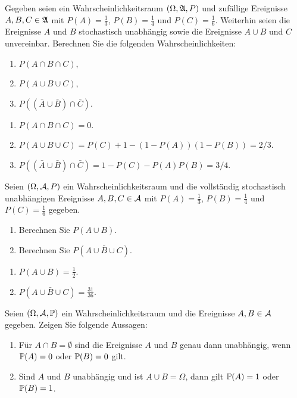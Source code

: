 Gegeben seien  ein Wahrscheinlichkeitsraum $(\Omega, \mathfrak{A}, P)$ und zuf\"allige Ereignisse $A, B, C
\in \mathfrak{A}$  mit $P(A)=\frac{1}{3}$, $P(B)=\frac{1}{4}$ und $P(C)=\frac{1}{6}$. 
Weiterhin seien die Ereignisse $A$ und $B$ stochastisch unabhängig sowie die Ereignisse $A\cup B$
und $C$ unvereinbar. Berechnen Sie die folgenden Wahrscheinlichkeiten:
\begin{enumerate}
    \item $P(A \cap B \cap C)$,
    \item $P(A \cup B \cup C)$,
    \item $P( ( \bar A \cup \bar B) \cap \bar C )$.
\end{enumerate}

\solution
\begin{enumerate}
    \item $P(A \cap B \cap C) = 0$.
    \item $P(A \cup B \cup C) = P(C) + 1 - (1 - P(A))(1-P(B)) = 2/3$.
    \item $P( ( \bar A \cup \bar B) \cap \bar C ) = 1 - P(C) - P(A)P(B) = 3/4$.
\end{enumerate}

Seien $(\Omega, \mathcal A, P)$ ein Wahrscheinlichkeitsraum und die vollständig
stochastisch unabhängigen Ereignisse $A, B, C \in \mathcal A$ mit $P(A)=\frac{1}{3}$,
$P(B)=\frac{1}{4}$ und $P(C)=\frac{1}{6}$ gegeben.
\begin{enumerate}
    \item Berechnen Sie $P(A \cup B)$.
    \item Berechnen Sie $P( A \cup \bar B \cup C)$.
\end{enumerate}

\solution
\begin{enumerate}
    \item $P(A \cup B) = \frac{1}{2}$. %
    \item $P(A \cup \bar B \cup C) = \frac{31}{36}$.  %
\end{enumerate}

 Seien $(\Omega, \mathcal A, \mathbb P)$ ein
Wahrscheinlichkeitsraum und die Ereignisse $A,B \in \mathcal A$ gegeben. Zeigen Sie
folgende Aussagen:
\begin{enumerate}
    \item Für $A\cap B=\emptyset$ sind die Ereignisse $A$ und $B$ genau dann
        unabhängig, wenn $\mathbb P(A)=0$ oder $\mathbb P(B)=0$ gilt.

    \item Sind $A$ und $B$ unabhängig und ist $A \cup B = \Omega$, dann gilt
        $\mathbb P(A)=1$ oder $\mathbb P(B)=1$. 
\end{enumerate}


